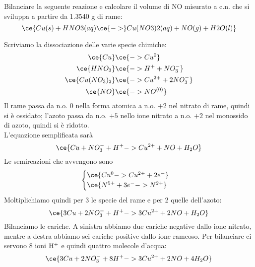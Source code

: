 \begin{esercizio}\label{EXR:chiarimento_HNO3}
    Bilanciare la seguente reazione e calcolare il volume di NO misurato a c.n. che si sviluppa a partire da 1.3540 g di rame:
    \begin{equation*}
        \ce{Cu(s) + HNO3(aq) \ce{->} Cu(NO3)2(aq) + NO(g) + H2O(l)}
    \end{equation*}
\end{esercizio}
\begin{soluzione}
    Scriviamo la dissociazione delle varie specie chimiche:
    \begin{equation*}
        \begin{split}
            \ce{Cu} & \ce{-> Cu^0}
            \\
            \ce{HNO_3} & \ce{-> H^+ + NO_3^-}
            \\
            \ce{Cu(NO_3)_2} & \ce{-> Cu^{2+} + 2NO_3^-}
            \\
            \ce{NO} & \ce{-> NO^{(0)}}
        \end{split}
    \end{equation*}
    Il rame passa da n.o. $0$ nella forma atomica a n.o. $+2$ nel nitrato di rame, quindi si è ossidato; l'azoto passa da n.o. $+5$ nello ione nitrato a n.o. $+2$ nel monossido di azoto, quindi si è ridotto.\\
    L'equazione semplificata sarà
    \begin{equation*}
        \ce{Cu + NO_3^- + H^+ -> Cu^{2+} + NO + H_2O}
    \end{equation*}
    Le semireazioni che avvengono sono
    \begin{equation*}
        \begin{cases}
            \ce{Cu^0 -> Cu^{2+} + 2e^-}\\
            \ce{N^{5+} + 3e^- -> N^{2+}}
        \end{cases}
    \end{equation*}
    Moltiplichiamo quindi per 3 le specie del rame e per 2 quelle dell'azoto:
    \begin{equation*}
        \ce{3Cu + 2NO_3^- + H^+ -> 3Cu^{2+} + 2NO + H_2O}
    \end{equation*}
    Bilanciamo le cariche. A sinistra abbiamo due cariche negative dallo ione nitrato, mentre a destra abbiamo sei cariche positive dallo ione rameoso. Per bilanciare ci servono 8 ioni $\rm H^+$ e quindi quattro molecole d'acqua:
    \begin{equation*}
        \ce{3Cu + 2NO_3^- + 8H^+ -> 3Cu^{2+} + 2NO + 4H_2O}

\end{equation*}
\end{soluzione}

